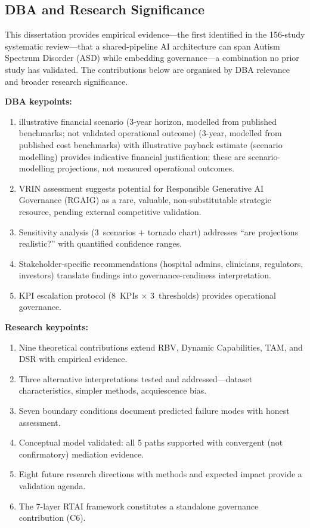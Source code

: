 \subsection{DBA and Research Significance}

This dissertation provides empirical evidence---the first identified in the 156-study systematic review---that a shared-pipeline AI architecture can span Autism Spectrum Disorder (ASD) while embedding governance---a combination no prior study has validated. The contributions below are organised by DBA relevance and broader research significance.

\noindent\textbf{DBA keypoints:}
\begin{enumerate}
    \item illustrative financial scenario (3-year horizon, modelled from published benchmarks; not validated operational outcome) (3-year, modelled from published cost benchmarks) with illustrative payback estimate (scenario modelling) provides indicative financial justification; these are scenario-modelling projections, not measured operational outcomes.
    \item VRIN assessment suggests potential for Responsible Generative AI Governance (RGAIG) as a rare, valuable, non-substitutable strategic resource, pending external competitive validation.
    \item Sensitivity analysis (3~scenarios + tornado chart) addresses ``are projections realistic?'' with quantified confidence ranges.
    \item Stakeholder-specific recommendations (hospital admins, clinicians, regulators, investors) translate findings into governance-readiness interpretation.
    \item KPI escalation protocol (8~KPIs $\times$ 3~thresholds) provides operational governance.
\end{enumerate}

\noindent\textbf{Research keypoints:}
\begin{enumerate}
    \item Nine theoretical contributions extend RBV, Dynamic Capabilities, TAM, and DSR with empirical evidence.
    \item Three alternative interpretations tested and addressed---dataset characteristics, simpler methods, acquiescence bias.
    \item Seven boundary conditions document predicted failure modes with honest assessment.
    \item Conceptual model validated: all 5 paths supported with convergent (not confirmatory) mediation evidence.
    \item Eight future research directions with methods and expected impact provide a validation agenda.
    \item The 7-layer RTAI framework constitutes a standalone governance contribution (C6).
\end{enumerate}

